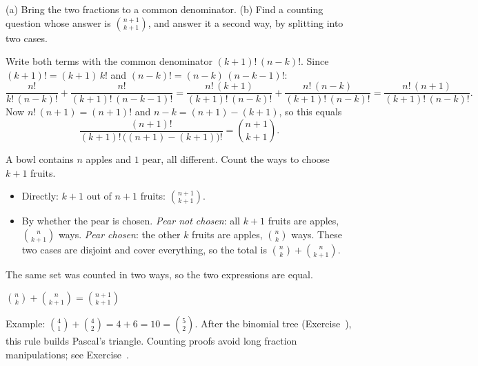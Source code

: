 \begin{solution}
	\idea (a) Bring the two fractions to a common denominator. (b) Find a
	counting question whose answer is $\binom{n+1}{k+1}$, and answer it a second
	way, by splitting into two cases.

	 Write both terms with the common denominator
	$(k+1)!\,(n-k)!$. Since $(k+1)!=(k+1)\,k!$ and $(n-k)!=(n-k)\,(n-k-1)!$:
	\[
		\frac{n!}{k!\,(n-k)!}+\frac{n!}{(k+1)!\,(n-k-1)!}
		=\frac{n!\,(k+1)}{(k+1)!\,(n-k)!}+\frac{n!\,(n-k)}{(k+1)!\,(n-k)!}
		=\frac{n!\,(n+1)}{(k+1)!\,(n-k)!}.
	\]
	Now $n!\,(n+1)=(n+1)!$ and $n-k=(n+1)-(k+1)$, so this equals
	\[ \frac{(n+1)!}{(k+1)!\,\big((n+1)-(k+1)\big)!}=\binom{n+1}{k+1}. \]

	 A bowl contains $n$
	apples and $1$ pear, all different. Count the ways to choose $k+1$ fruits.
	\begin{itemize}[nosep]
		\item Directly: $k+1$ out of $n+1$ fruits: $\binom{n+1}{k+1}$.
		\item By whether the pear is chosen. \emph{Pear not chosen}: all $k+1$
		      fruits are apples, $\binom n{k+1}$ ways. \emph{Pear chosen}: the
		      other $k$ fruits are apples, $\binom nk$ ways. These two cases are
		      disjoint and cover everything, so the total is
		      $\binom nk+\binom n{k+1}$.
	\end{itemize}
	The same set was counted in two ways, so the two expressions are equal.
	\begin{answer}
		$\binom nk+\binom n{k+1}=\binom{n+1}{k+1}$
	\end{answer}
	\begin{remark}
		Example: $\binom41+\binom42=4+6=10=\binom52$. After the binomial tree
		(Exercise~), this rule builds Pascal's triangle.
		Counting proofs avoid long fraction manipulations; see
		Exercise~.
	\end{remark}
\end{solution}
